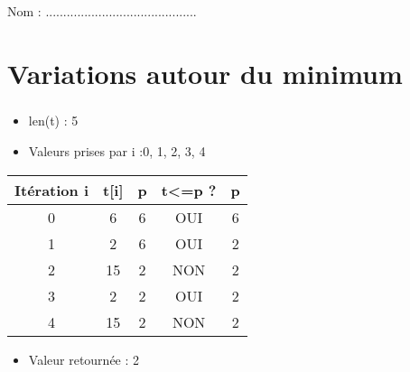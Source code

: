 \documentclass[10pt]{article}
\newif\ifprof
\newif\ifxp
\begin{document}
\ifxp

\else

\fi


\begin{center}
\Large Nom  : ...........................................
\end{center}

 \renewcommand{\baselinestretch}{1.2}
\setlength{\parskip}{2ex plus 0.5ex minus 0.2ex}


\section{Variations autour du minimum}

\subparagraph{}
\textit{}%
\ifprof
\begin{corrige}
\begin{itemize}
\item \textsf{len(t)} : 5
\item Valeurs prises par \textsf{i} :0, 1, 2, 3, 4
\end{itemize}
\begin{center}
\begin{tabular} {|c||c|c||c|c|}
\hline
Itération \textsf{i} & \textsf{t[i]} & \textsf{p} & \textsf{t<=p} ? & p \\
\hline
0 & 6 & 6 & OUI & 6\\
1 & 2 & 6 & OUI & 2\\
2 & 15 & 2  & NON & 2\\
3 &  2 & 2 & OUI & 2\\
4 &  15 & 2 & NON & 2\\
\hline
\end{tabular}
\end{center}

\begin{itemize}
\item Valeur retournée : 2
\end{itemize}
\end{corrige}
\else
\end{document}
